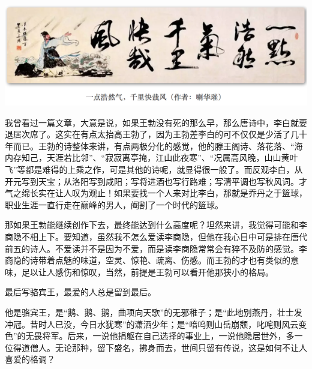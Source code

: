 \documentclass[]{book}
\begin{document}
\includegraphics[width=8.33in]{images/ctsj6}

我曾看过一篇文章，大意是说，如果王勃没有死的那么早，那么唐诗中，李白就要退居次席了。这实在有点太抬高王勃了，因为王勃差李白的可不仅仅是少活了几十年而已。王勃的诗整体来讲，有点两极分化的感觉，他的滕王阁诗、落花落、``海内存知己，天涯若比邻''、``寂寂离亭掩，江山此夜寒''、``况属高风晚，山山黄叶飞''等都是难得的上乘之作，可是其他的诗呢，就显得很一般了。而反观李白，从开元写到天宝；从洛阳写到咸阳；写将进酒也写行路难；写清平调也写秋风词。才气之绵长实在让人叹为观止！如果要找一个人来对比李白，那就是乔丹之于篮球，职业生涯一直行走在巅峰的男人，阉割了一个时代的篮球。

那如果王勃能继续创作下去，最终能达到什么高度呢？坦然来讲，我觉得可能和李商隐不相上下。要知道，虽然我不怎么爱读李商隐，但他在我心目中可是排在唐代前五的诗人。不爱读并不是因为不爱，而是读李商隐常常会有猝不及防的感觉。李商隐的诗带着点魅的味道，空灵、惊艳、疏离、伤感。而王勃的才也有类似的意味，足以让人感伤和惊叹，当然，前提是王勃可以看开他那狭小的格局。

最后写骆宾王，最爱的人总是留到最后。

他是骆宾王，是``鹅、鹅、鹅，曲项向天歌''的无邪稚子；是``此地别燕丹，壮士发冲冠。昔时人已没，今日水犹寒''的潇洒少年；是``喑呜则山岳崩颓，叱咤则风云变色''的无畏将军。后来，一说他捐躯在自己选择的事业上，一说他隐居世外，多一位得道僧人。无论那种，留下盛名，拂身而去，世间只留有传说，这是如何不让人喜爱的格调？
\end{document}

